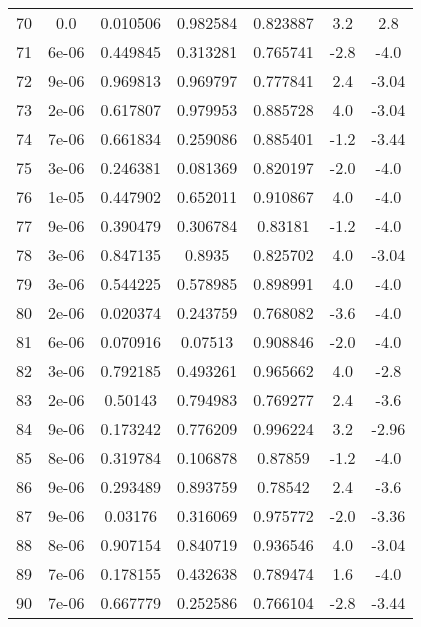 \begin{table}
\begin{tabular}{c|c|c|c|c|c|c}
70 & 0.0 & 0.010506 & 0.982584 & 0.823887 & 3.2 & 2.8\\
71 & 6e-06 & 0.449845 & 0.313281 & 0.765741 & -2.8 & -4.0\\
72 & 9e-06 & 0.969813 & 0.969797 & 0.777841 & 2.4 & -3.04\\
73 & 2e-06 & 0.617807 & 0.979953 & 0.885728 & 4.0 & -3.04\\
74 & 7e-06 & 0.661834 & 0.259086 & 0.885401 & -1.2 & -3.44\\
75 & 3e-06 & 0.246381 & 0.081369 & 0.820197 & -2.0 & -4.0\\
76 & 1e-05 & 0.447902 & 0.652011 & 0.910867 & 4.0 & -4.0\\
77 & 9e-06 & 0.390479 & 0.306784 & 0.83181 & -1.2 & -4.0\\
78 & 3e-06 & 0.847135 & 0.8935 & 0.825702 & 4.0 & -3.04\\
79 & 3e-06 & 0.544225 & 0.578985 & 0.898991 & 4.0 & -4.0\\
80 & 2e-06 & 0.020374 & 0.243759 & 0.768082 & -3.6 & -4.0\\
81 & 6e-06 & 0.070916 & 0.07513 & 0.908846 & -2.0 & -4.0\\
82 & 3e-06 & 0.792185 & 0.493261 & 0.965662 & 4.0 & -2.8\\
83 & 2e-06 & 0.50143 & 0.794983 & 0.769277 & 2.4 & -3.6\\
84 & 9e-06 & 0.173242 & 0.776209 & 0.996224 & 3.2 & -2.96\\
85 & 8e-06 & 0.319784 & 0.106878 & 0.87859 & -1.2 & -4.0\\
86 & 9e-06 & 0.293489 & 0.893759 & 0.78542 & 2.4 & -3.6\\
87 & 9e-06 & 0.03176 & 0.316069 & 0.975772 & -2.0 & -3.36\\
88 & 8e-06 & 0.907154 & 0.840719 & 0.936546 & 4.0 & -3.04\\
89 & 7e-06 & 0.178155 & 0.432638 & 0.789474 & 1.6 & -4.0\\
90 & 7e-06 & 0.667779 & 0.252586 & 0.766104 & -2.8 & -3.44\\
\end{tabular}
\end{table}
\newpage
